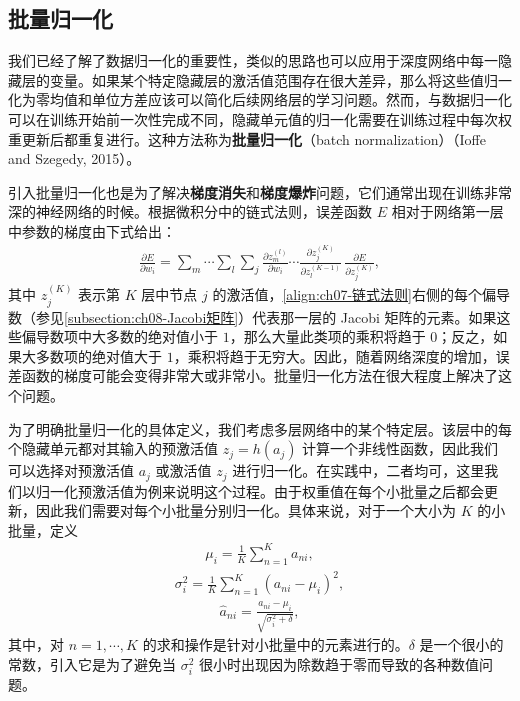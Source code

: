 \documentclass[../../main.tex]{subfiles}
\begin{document}
\subsection{批量归一化}\label{subsection:ch07-批量归一化}

我们已经了解了数据归一化的重要性，类似的思路也可以应用于深度网络中每一隐藏层的变量。如果某个特定隐藏层的激活值范围存在很大差异，那么将这些值归一化为零均值和单位方差应该可以简化后续网络层的学习问题。然而，与数据归一化可以在训练开始前一次性完成不同，隐藏单元值的归一化需要在训练过程中每次权重更新后都重复进行。这种方法称为\textbf{批量归一化}（batch normalization）（Ioffe and Szegedy, 2015）。

引入批量归一化也是为了解决\textbf{梯度消失}和\textbf{梯度爆炸}问题，它们通常出现在训练非常深的神经网络的时候。根据微积分中的链式法则，误差函数 $E$ 相对于网络第一层中参数的梯度由下式给出：
\begin{align}
\frac{\partial E}{\partial w_i} = \sum_m\cdots\sum_l\sum_j
\frac{\partial z_m^{(l)}}{\partial w_i}\cdots
\frac{\partial z_j^{(K)}}{\partial z_l^{(K-1)}}\,
\frac{\partial E}{\partial z_j^{(K)}},
\label{align:ch07-链式法则}
\end{align}
其中 $z_j^{(K)}$ 表示第 $K$ 层中节点 $j$ 的激活值，\eqref{align:ch07-链式法则}右侧的每个偏导数（参见\cref{subsection:ch08-Jacobi矩阵}）代表那一层的 Jacobi 矩阵的元素。如果这些偏导数项中大多数的绝对值小于 $1$，那么大量此类项的乘积将趋于 $0$；反之，如果大多数项的绝对值大于 $1$，乘积将趋于无穷大。因此，随着网络深度的增加，误差函数的梯度可能会变得非常大或非常小。批量归一化方法在很大程度上解决了这个问题。

为了明确批量归一化的具体定义，我们考虑多层网络中的某个特定层。该层中的每个隐藏单元都对其输入的预激活值 $z_j=h(a_j)$ 计算一个非线性函数，因此我们可以选择对预激活值 $a_j$ 或激活值 $z_j$ 进行归一化。在实践中，二者均可，这里我们以归一化预激活值为例来说明这个过程。由于权重值在每个小批量之后都会更新，因此我们需要对每个小批量分别归一化。具体来说，对于一个大小为 $K$ 的小批量，定义
\begin{align}
\mu_i = \frac{1}{K}\sum_{n=1}^{K}a_{ni},
\label{align:ch07-批均值}
\end{align}
\begin{align}
\sigma_i^{2} = \frac{1}{K}\sum_{n=1}^{K}(a_{ni}-\mu_i)^{2},
\label{align:ch07-批方差}
\end{align}
\begin{align}
\hat{a}_{ni} = \frac{a_{ni}-\mu_i}{\sqrt{\sigma_i^{2}+\delta}},
\label{align:ch07-批标准化}
\end{align}
其中，对 $n=1,\cdots,K$ 的求和操作是针对小批量中的元素进行的。$\delta$ 是一个很小的常数，引入它是为了避免当 $\sigma_i^{2}$ 很小时出现因为除数趋于零而导致的各种数值问题。
\end{document}
